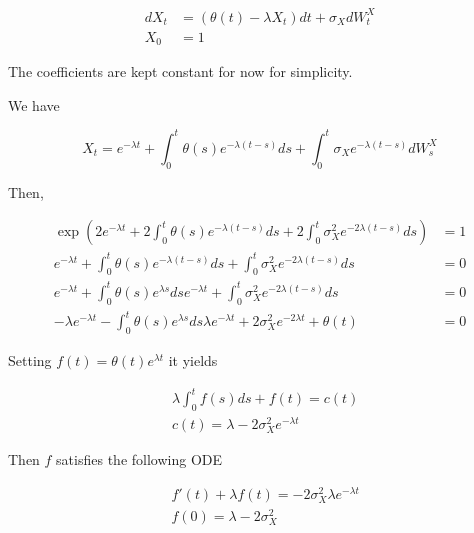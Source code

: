 \documentclass{article}
\begin{document}
\begin{equation}
\begin{aligned}
	dX_t &= (\theta(t) - \lambda X_t) dt + \sigma_X dW_t^X\\
	X_0 &= 1
\end{aligned}
\end{equation}

\noindent The coefficients are kept constant for now for simplicity.

\noindent We have 

\begin{equation}
	X_t = e^{-\lambda t} + \int_{0}^t \theta(s) e^{-\lambda (t-s)} ds + \int_0^t \sigma_X e^{-\lambda(t-s)} dW_s^X
\end{equation}

\noindent Then,

\begin{equation*}
\begin{aligned}
	\exp\left(2e^{-\lambda t} + 2\int_{0}^t \theta(s) e^{-\lambda (t-s)} ds + 2\int_0^t \sigma_X^2 e^{-2\lambda(t-s)} ds\right) &= 1\\
	e^{-\lambda t} + \int_{0}^t \theta(s) e^{-\lambda (t-s)} ds + \int_0^t \sigma_X^2 e^{-2\lambda(t-s)} ds &= 0\\
	e^{-\lambda t} + \int_{0}^t \theta(s) e^{\lambda s} ds e^{-\lambda t} + \int_0^t \sigma_X^2 e^{-2\lambda(t-s)} ds &= 0\\
	-\lambda e^{-\lambda t} - \int_{0}^t \theta(s) e^{\lambda s} ds \lambda e^{-\lambda t} + 2 \sigma_X^2 e^{-2\lambda t} + \theta(t) &= 0
\end{aligned}
\end{equation*}

Setting $f(t) = \theta(t) e^{\lambda t}$ it yields

\begin{equation}
\begin{aligned}
	&\lambda \int_0^t f(s) ds + f(t) = c(t)\\
	&c(t) = \lambda - 2\sigma_X^2 e^{-\lambda t}
\end{aligned}
\end{equation}

\noindent Then $f$ satisfies the following ODE

\begin{equation}
\begin{aligned}
	& f'(t) + \lambda f(t) = -2 \sigma_X^2 \lambda e^{-\lambda t}\\
	&f(0) = \lambda - 2\sigma_X^2
\end{aligned}
\end{equation}
\end{document}
